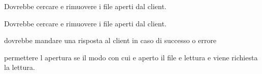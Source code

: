 
\begin{DoxyRefList}
\item[\label{todo__todo000001}%
\hypertarget{todo__todo000001}{}%
global\+Scope$>$ Globale \hyperlink{BYE_8h_a2e130b9a6559e17fb5a989e57aaa0945}{handle\+Bye\+Command} (int)]Dovrebbe cercare e rimuovere i file aperti dal client.  
\item[\label{todo__todo000001}%
\hypertarget{todo__todo000001}{}%
global\+Scope$>$ Globale \hyperlink{BYE_8h_a2e130b9a6559e17fb5a989e57aaa0945}{handle\+Bye\+Command} (int)]Dovrebbe cercare e rimuovere i file aperti dal client.  
\item[\label{todo__todo000002}%
\hypertarget{todo__todo000002}{}%
File \hyperlink{OPE_8c}{O\+P\+E.c} ]dovrebbe mandare una risposta al client in caso di successo o errore 

permettere l\textquotesingle{} apertura se il modo con cui e\textquotesingle{} aperto il file e\textquotesingle{} lettura e viene richiesta la lettura. 
\end{DoxyRefList}